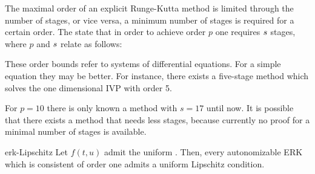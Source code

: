 \begin{remark}
  The maximal order of an explicit Runge-Kutta method is limited
  through the number of stages, or vice versa, a minimum number of
  stages is required for a certain order. The  state
  that in order to achieve order $p$ one requires $s$ stages, where
  $p$ and $s$ relate as follows:
  \begin{center}
    
  \end{center}
  
  These order bounds refer to systems of differential equations.  For
  a simple equation they may be better. For instance, there exists a
  five-stage method which solves the one dimensional IVP with order 5.

  For $p = 10$ there is only known a method with $s = 17$ until now.
  It is possible that there exists a method that needs less stages,
  because currently no proof for a minimal number of stages is
  available.
\end{remark}

\begin{Lemma}{erk-Lipschitz}
  Let $f(t,u)$ admit the uniform . Then,
  every autonomizable ERK which is consistent of order one admits a
  uniform Lipschitz condition.
\end{Lemma}

